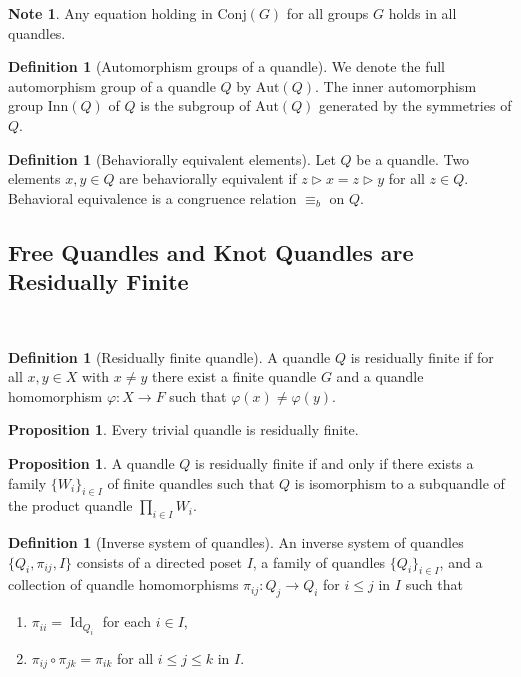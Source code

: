 \documentclass[reqno,dvipsnames]{amsart}
\newcommand{\tr}{\triangleright}
\DeclareMathOperator*{\Id}{Id}                       %
\renewcommand{\phi}{\varphi}
\newcommand{\Conj}{\text{Conj}}
\newcommand{\Inn}{\text{Inn}}
\newcommand{\Aut}{\text{Aut}}
\theoremstyle{definition}
\newtheorem{proposition}[theorem]{Proposition}
\newtheorem{definition}[theorem]{Definition}
\newtheorem{note}[theorem]{Note}
\begin{document}
\begin{note}
Any equation holding in $\Conj(G)$ for all groups $G$ holds in all quandles.
\end{note}

\begin{definition}[Automorphism groups of a quandle]
We denote the full automorphism group of a quandle $Q$ by $\Aut(Q)$. The inner automorphism group $\Inn(Q)$ of $Q$ is the subgroup of $\Aut(Q)$ generated by the symmetries of $Q$.
\end{definition}

\begin{definition}[Behaviorally equivalent elements]
Let $Q$ be a quandle. Two elements $x,y\in Q$ are behaviorally equivalent if $z\tr x=z\tr y$ for all $z\in Q$. Behavioral equivalence is a congruence relation $\equiv_b$ on $Q$.
\end{definition}

\vspace{0.25in}

\subsection{Free Quandles and Knot Quandles are Residually Finite}~\cite{Bardakov_2019}

\begin{definition}[Residually finite quandle]
A quandle $Q$ is residually finite if for all $x,y\in X$ with $x\neq y$ there exist a finite quandle $G$ and a quandle homomorphism $\phi:X\to F$ such that $\phi(x)\neq\phi(y)$.
\end{definition}

\begin{proposition}
Every trivial quandle is residually finite.
\end{proposition}

\begin{proposition}
A quandle $Q$ is residually finite if and only if there exists a family $\{W_i\}_{i\in I}$ of finite quandles such that $Q$ is isomorphism to a subquandle of the product quandle $\prod_{i\in I}W_i$.
\end{proposition}

\begin{definition}[Inverse system of quandles]
An inverse system of quandles $\{Q_i,\pi_{ij},I\}$ consists of a directed poset $I$, a family of quandles $\{Q_i\}_{i\in I}$, and a collection of quandle homomorphisms $\pi_{ij}:Q_j\to Q_i$ for $i\leq j$ in $I$ such that
\begin{enumerate}
    \item $\pi_{ii}=\Id_{Q_i}$ for each $i\in I$,
    \item $\pi_{ij}\circ \pi_{jk}=\pi_{ik}$ for all $i\leq j\leq k$ in $I$.
\end{enumerate}
\end{definition}
\end{document}
